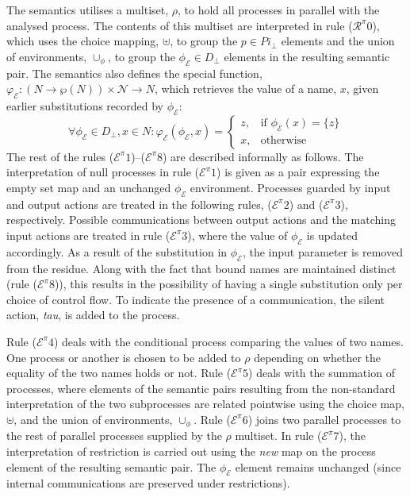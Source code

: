 \documentclass[10pt,a4paper,final,oneside,fleqn]{book}
\begin{document}
The semantics utilises a multiset, $\rho$, to hold all processes in parallel with the analysed process. The contents of this multiset are interpreted in rule ($\mathcal{R}^\pi 0$), which uses the choice mapping, $\uplus$, to group the $p\in Pi_\bot$ elements and the union of environments, $\cup_\phi$, to group the $\phi_\mathcal{E}\in D_\bot$ elements in the resulting semantic pair.  The semantics also defines the special function, $\varphi_\mathcal{E}:(N\to\wp(N))\times\mathcal{N}\to N$, which retrieves the value of a name, $x$, given earlier substitutions recorded by $\phi_\mathcal{E}$:
\[\forall\phi_\mathcal{E}\in D_\bot,x\in N:\varphi_\mathcal{E}(\phi_\mathcal{E},x)=\left\{\begin{array}{ll}z,&\mbox{if }\phi_\mathcal{E}(x)=\{z\}\\
x,&\mbox{otherwise}\end{array}\right.\]
The rest of the rules ($\mathcal{E}^\pi 1$)--($\mathcal{E}^\pi 8$) are described informally as follows.  The interpretation of null processes in rule ($\mathcal{E}^\pi 1$) is given as a pair expressing the empty set map and an unchanged $\phi_\mathcal{E}$ environment.  Processes guarded by input and output actions are treated in the following rules, ($\mathcal{E}^\pi 2$) and ($\mathcal{E}^\pi 3$), respectively.  Possible communications between output actions and the matching input actions are treated in rule ($\mathcal{E}^\pi 3$), where the value of $\phi_\mathcal{E}$ is updated accordingly.  As a result of the substitution in $\phi_\mathcal{E}$, the input parameter is removed from the residue. Along with the fact that bound names are maintained distinct (rule ($\mathcal{E}^\pi 8$)), this results in the possibility of having a single substitution only per choice of control flow. To indicate the presence of a communication, the silent action, {\itshape tau\/}, is added to the process.

Rule ($\mathcal{E}^\pi 4$) deals with the conditional process comparing the values of two names.  One process or another is chosen to be added to $\rho$ depending on whether the equality of the two names holds or not. Rule ($\mathcal{E}^\pi 5$) deals with the summation of processes, where elements of the semantic pairs resulting from the non-standard interpretation of the two subprocesses are related pointwise using the choice map, $\uplus$, and the union of environments, $\cup_\phi$.  Rule ($\mathcal{E}^\pi 6$) joins two parallel processes to the rest of parallel processes supplied by the $\rho$ multiset.  In rule ($\mathcal{E}^\pi 7$), the interpretation of restriction is carried out using the {\itshape new\/} map on the process element of the resulting semantic pair.  The $\phi_\mathcal{E}$ element remains unchanged (since internal communications are preserved under restrictions).
\end{document}
